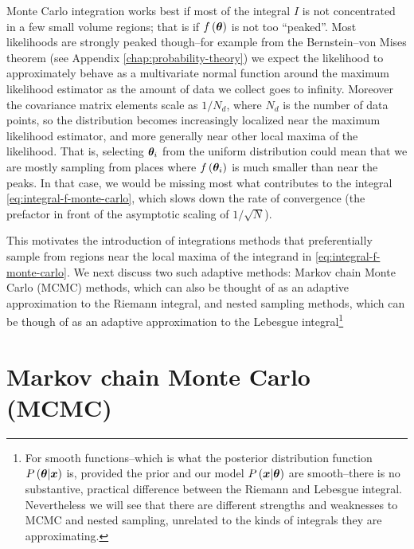 Monte Carlo integration works best if most of the integral $I$ is not concentrated in a few small volume regions; that is if $f\left({\bm \theta}\right)$ is not too ``peaked''.
Most likelihoods are strongly peaked though--for example from the
Bernstein–von Mises theorem (see Appendix \ref{chap:probability-theory})
we expect the likelihood to approximately behave as a multivariate normal function 
around the maximum likelihood estimator as the amount of data we collect
goes to infinity. 
Moreover the covariance matrix elements scale as $1/N_d$, where $N_d$ is the
number of data points, so the distribution becomes increasingly localized
near the maximum likelihood estimator, and more generally near other local
maxima of the likelihood.
That is, selecting ${\bm \theta}_i$ from the uniform distribution could mean that
we are mostly sampling from places where $f\left({\bm \theta}_i\right)$ is much smaller
than near the peaks. 
In that case, we would be missing most what contributes to the integral
\eqref{eq:integral-f-monte-carlo}, which slows down the rate of convergence
(the prefactor in front of the asymptotic scaling of $1/\sqrt{N}$).

This motivates the introduction of integrations methods that preferentially sample
from regions near the local maxima of the integrand in 
\eqref{eq:integral-f-monte-carlo}.
We next discuss two such adaptive methods:
Markov chain Monte Carlo (MCMC) methods, which can
also be thought of as an adaptive approximation to the Riemann integral, and
nested sampling methods, which can be though of as an adaptive approximation 
to the Lebesgue integral\footnote{For smooth functions--which is what the posterior distribution
function $P\left({\bm \theta}|{\bm x}\right)$ is, provided the prior and 
our model $P\left({\bm x}|{\bm \theta}\right)$ are smooth--there 
is no substantive, practical difference between the Riemann and Lebesgue integral.
Nevertheless we will see that there are different strengths and weaknesses
to MCMC and nested sampling, 
unrelated to the kinds of integrals they are approximating.} 

\section{Markov chain Monte Carlo (MCMC)\label{sec:mcmc}}

